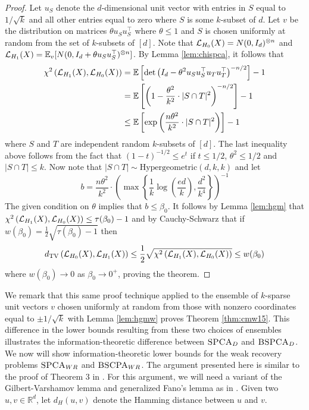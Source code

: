 \begin{proof}
Let $u_S$ denote the $d$-dimensional unit vector with entries in $S$ equal to $1/\sqrt{k}$ and all other entries equal to zero where $S$ is some $k$-subset of $d$. Let $v$ be the distribution on matrices $\theta u_Su_S^\top$ where $\theta \le 1$ and $S$ is chosen uniformly at random from the set of $k$-subsets of $[d]$. Note that $\mathcal{L}_{H_0}(X) = N(0, I_d)^{\otimes n}$ and $\mathcal{L}_{H_1}(X) = \mathbb{E}_v[N(0, I_d + \theta u_S u_S^\top)^{\otimes n}]$. By Lemma \ref{lem:chispca}, it follows that
\begin{align*}
\chi^2\left( \mathcal{L}_{H_1}(X), \mathcal{L}_{H_0}(X) \right) &=  \mathbb{E} \left[ \det\left(I_d - \theta^2 u_S u_S^\top u_T u_T^\top\right)^{-n/2} \right] - 1 \\
&= \mathbb{E}\left[ \left( 1 - \frac{\theta^2}{k^2} \cdot |S \cap T|^2 \right)^{-n/2} \right] - 1 \\
&\le \mathbb{E}\left[ \exp\left( \frac{n\theta^2}{k^2} \cdot |S \cap T|^2 \right) \right] - 1
\end{align*}
where $S$ and $T$ are independent random $k$-subsets of $[d]$. The last inequality above follows from the fact that $(1 - t)^{-1/2} \le e^t$ if $t \le 1/2$, $\theta^2 \le 1/2$ and $|S \cap T| \le k$. Now note that $|S \cap T| \sim \text{Hypergeometric}(d, k, k)$ and let
$$b = \frac{n\theta^2}{k^2} \cdot \left( \max\left\{ \frac{1}{k} \log \left( \frac{ed}{k} \right), \frac{d^2}{k^4} \right\} \right)^{-1}$$
The given condition on $\theta$ implies that $b \le \beta_0$. It follows by Lemma \ref{lem:hgm} that $\chi^2\left( \mathcal{L}_{H_1}(X), \mathcal{L}_{H_0}(X) \right) \le \tau(\beta_0) - 1$ and by Cauchy-Schwarz that if $w(\beta_0) = \frac{1}{2} \sqrt{\tau(\beta_0) - 1}$ then
$$d_{\text{TV}}\left( \mathcal{L}_{H_0}(X), \mathcal{L}_{H_1}(X) \right) \le \frac{1}{2}\sqrt{\chi^2\left( \mathcal{L}_{H_1}(X), \mathcal{L}_{H_0}(X) \right)} \le w(\beta_0)$$
where $w(\beta_0) \to 0$ as $\beta_0 \to 0^+$, proving the theorem.
\end{proof}

We remark that this same proof technique applied to the ensemble of $k$-sparse unit vectors $v$ chosen uniformly at random from those with nonzero coordinates equal to $\pm 1/\sqrt{k}$ with Lemma \ref{lem:hgmw} proves Theorem \ref{thm:cmw15}. This difference in the lower bounds resulting from these two choices of ensembles illustrates the information-theoretic difference between $\textsc{SPCA}_D$ and $\textsc{BSPCA}_D$. We now will show information-theoretic lower bounds for the weak recovery problems $\textsc{SPCA}_{WR}$ and $\textsc{BSCPA}_{WR}$. The argument presented here is similar to the proof of Theorem 3 in \cite{wang2016statistical}. For this argument, we will need a variant of the Gilbert-Varshamov lemma and generalized Fano's lemma as in \cite{wang2016statistical}. Given two $u, v\in \mathbb{R}^d$, let $d_H(u, v)$ denote the Hamming distance between $u$ and $v$.

